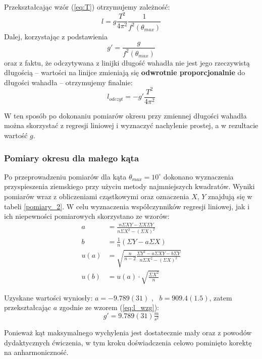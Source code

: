 \documentclass[a4paper]{article}
\newlength{\du}
\begin{document}
Przekształcając wzór (\ref{eq:T})  otrzymujemy zależność:
\[l = g\frac{T^2}{4\pi^2}\frac{1}{f^2(\theta_{max})} \]
Dalej, korzystając z podstawienia \[g' = \frac{g}{f^2(\theta_{max})} \]
oraz z faktu, że odczytywana z linijki długość wahadła nie jest jego rzeczywistą długością --
wartości na linijce zmieniają się \textbf{odwrotnie proporcjonalnie} do długości wahadła --
otrzymujemy finalnie:
\begin{equation} \label{eq:l_wzg}
 l_{odczyt} = -g'\frac{T^2}{4\pi^2}
\end{equation}

W ten sposób po dokonaniu pomiarów okresu przy zmiennej długości wahadła można skorzystać z regresji liniowej i wyznaczyć nachylenie prostej, a w rezultacie wartość $g$.

\subsubsection{Pomiary okresu dla małego kąta}

Po przeprowadzeniu pomiarów dla kąta $\theta_{max} = 10^\circ$ dokonano wyznaczenia 
przyspieszenia ziemskiego przy użyciu metody najmniejszych kwadratów. 
Wyniki pomiarów wraz z obliczeniami cząstkowymi oraz oznaczenia $X$, $Y$ znajdują się w tabeli \ref{pomiary_2}.
W celu wyznaczenia współczynników regresji liniowej, jak i ich niepewności pomiarowych skorzystano ze wzorów:
\begin{align*}
a &= \frac{n \Sigma X Y - \Sigma X \Sigma Y}{n \Sigma X^2 - \left(\Sigma X\right)^2} \\
b &= \frac{1}{n}\left(\Sigma Y - a \Sigma X\right) \\
u(a) &= \sqrt{\frac{n}{n-2} \frac{\Sigma Y^2 - a\Sigma XY - b\Sigma Y}{n\Sigma X^2-\left(\Sigma X \right)^2}} \\
u(b) &= u(a)\cdot \sqrt{\frac{\Sigma X^2}{n}}
\end{align*}

Uzyskane wartości wyniosły: $a = -9.789(31)$  , \ $b = 909.4(1.5)$,
zatem przekształcając $a$ zgodnie ze wzorem (\ref{eq:l_wzg}):  \[g' = 9.789(31)  \tfrac{m}{s^2}\]

Ponieważ kąt maksymalnego wychylenia jest dostatecznie mały oraz z powodów dydaktycznych ćwiczenia,
w tym kroku doświadczenia celowo pominięto korektę na anharmoniczność.
\end{document}
